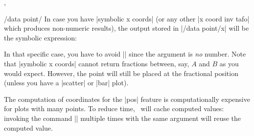 {\begin{commandlist}{\pgfplotspointplotattime,\pgfplotspointplotattime{}}
\begin{pgfplotsxykeylist}{/data point/\x}
	In case you have |symbolic x coords| (or any other |x coord inv tafo| which produces non-numeric results), the output stored in |/data point/x| will be the symbolic expression:
\begin{codeexample}[]
\end{codeexample}
	\noindent In that specific case, you have to avoid |\pgfmathprintnumber| since the argument is \emph{no} number. Note that |symbolic x coords| cannot return fractions between, say, $A$ and $B$ as you would expect. However, the point will still be placed at the fractional position (unless you have a |scatter| or |bar| plot).

	 The computation of coordinates for the |pos| feature is computationally expensive for plots with many points. To reduce time, \PGFPlots\ will cache computed values: invoking the command |\pgfplotspointplotattime| multiple times with the same argument will reuse the computed value.
\end{pgfplotsxykeylist}


\end{commandlist}

}


